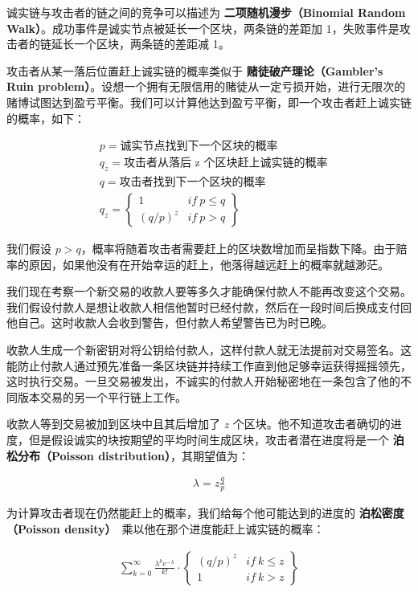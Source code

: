 \documentclass{article}
\begin{document}
诚实链与攻击者的链之间的竞争可以描述为 \textbf{二项随机漫步（Binomial Random Walk）}。成功事件是诚实节点被延长一个区块，两条链的差距加 1，失败事件是攻击者的链延长一个区块，两条链的差距减 1。

攻击者从某一落后位置赶上诚实链的概率类似于 \textbf{赌徒破产理论（Gambler's Ruin problem）}。设想一个拥有无限信用的赌徒从一定亏损开始，进行无限次的赌博试图达到盈亏平衡。我们可以计算他达到盈亏平衡，即一个攻击者赶上诚实链的概率，如下\cite{Feller}：

\begin{align*}
  & p = \text{诚实节点找到下一个区块的概率}            \\
  & q_z = \text{攻击者从落后 z 个区块赶上诚实链的概率} \\
  & q = \text{攻击者找到下一个区块的概率}              \\
  & q_z =                                              
 \begin{Bmatrix}
  1         & if \ p \leq q \\
  (q / p)^z & if \ p > q    
 \end{Bmatrix}
\end{align*}


我们假设 $p > q$，概率将随着攻击者需要赶上的区块数增加而呈指数下降。由于赔率的原因，如果他没有在开始幸运的赶上，他落得越远赶上的概率就越渺茫。

我们现在考察一个新交易的收款人要等多久才能确保付款人不能再改变这个交易。我们假设付款人是想让收款人相信他暂时已经付款，然后在一段时间后换成支付回他自己。这时收款人会收到警告，但付款人希望警告已为时已晚。

收款人生成一个新密钥对将公钥给付款人，这样付款人就无法提前对交易签名。这能防止付款人通过预先准备一条区块链并持续工作直到他足够幸运获得摇摇领先，这时执行交易。一旦交易被发出，不诚实的付款人开始秘密地在一条包含了他的不同版本交易的另一个平行链上工作。

收款人等到交易被加到区块中且其后增加了 $z$ 个区块。他不知道攻击者确切的进度，但是假设诚实的块按期望的平均时间生成区块，攻击者潜在进度将是一个 \textbf{泊松分布（Poisson distribution）}，其期望值为：

\begin{align*}
 \lambda = z\frac{q}{p}
\end{align*}

为计算攻击者现在仍然能赶上的概率，我们给每个他可能达到的进度的 \textbf{泊松密度（Poisson density）}\ 乘以他在那个进度能赶上诚实链的概率：

\begin{align*}
 \sum_{k = 0}^{\infty}
 \frac{\lambda^ke^{-\lambda}}{k!}
 \cdot
 \begin{Bmatrix}
  (q / p)^z & if \ k \leq z \\
  1         & if \ k > z    
 \end{Bmatrix}
\end{align*}
\end{document}
